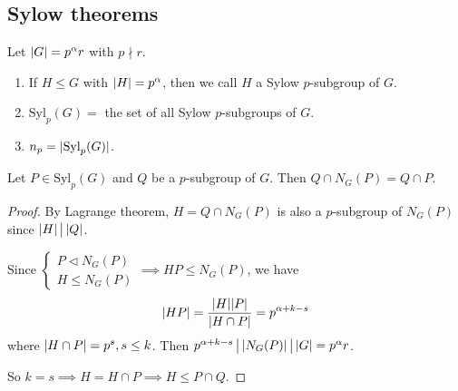 \subsection{Sylow theorems}

\begin{definition}
  Let $\lvert G\rvert = p^\alpha r$ with $p \nmid r$.
  \begin{enumerate}
    \item If $H \le G$ with $\lvert H\rvert = p^\alpha$, then we call $H$ a Sylow
      $p$-subgroup of $G$.
    \item $\text{Syl}_p(G) =$ the set of all Sylow $p$-subgroups of $G$.
    \item $n_p = \lvert\text{Syl}_p(G)\rvert$.
  \end{enumerate}
\end{definition}

\begin{lemma}
  Let $P \in \text{Syl}_p(G)$ and $Q$ be a $p$-subgroup of $G$. Then
  $Q \cap N_G(P) = Q \cap P$.

  \begin{proof}
    By Lagrange theorem, $H = Q \cap N_G(P)$ is also a $p$-subgroup of
    $N_G(P)$ since $\lvert H\rvert \,\big|\, \lvert Q\rvert$.

    Since $\begin{cases}
      P \lhd N_G(P) \\
      H \le N_G(P)
    \end{cases} \implies HP \le N_G(P)$, we have
    \[
      \lvert HP\rvert = \frac{\lvert H\rvert\lvert P\rvert}{\lvert H\cap P\rvert} = p^{\alpha+k-s}
    \]
    where $\lvert H\cap P\rvert = p^s, s \le k$. Then
    $p^{\alpha+k-s} \Div \abs*{N_G(P)} \Div \abs{G} = p^\alpha r$.

    So $k = s \implies H = H \cap P \implies H \le P \cap Q$.
  \end{proof}
\end{lemma}

